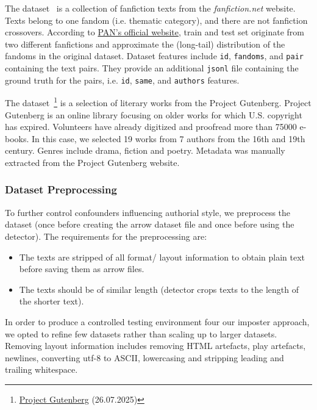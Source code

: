 The \dataPan{} dataset~\citep{bischoff_importance_2020} is a collection of fanfiction texts from the \textit{fanfiction.net} website.
Texts belong to one fandom (i.e. thematic category), and there are not fanfiction crossovers.
According to \href{https://pan.webis.de/clef20/pan20-web/author-identification.html}{PAN's official website}, 
train and test set originate from two different fanfictions and approximate the (long-tail) distribution of the fandoms in the original dataset.
Dataset features include \texttt{id}, \texttt{fandoms}, and \texttt{pair} containing the text pairs.
They provide an additional \texttt{jsonl} file containing the ground truth for the pairs, 
i.e. \texttt{id}, \texttt{same}, and \texttt{authors} features.

The \dataGutenberg{} dataset~\footnote{\href{https://www.gutenberg.org/}{Project Gutenberg} (26.07.2025)} 
is a selection of literary works from the Project Gutenberg.
Project Gutenberg is an online library focusing on older works for which U.S. copyright has expired.
Volunteers have already digitized and proofread more than \num{75000} e-books.
In this case, we selected 19 works from 7 authors from the 16th and 19th century.
Genres include drama, fiction and poetry.
Metadata was manually extracted from the Project Gutenberg website.


\subsubsection{Dataset Preprocessing}
\label{subsubsec:dataset_preprocessing}

To further control confounders influencing authorial style, we preprocess the dataset 
(once before creating the arrow dataset file and once before using the detector).
The requirements for the preprocessing are:
\begin{itemize}
    \item The texts are stripped of all format/ layout information to obtain plain text before saving them as arrow files.
    \item The texts should be of similar length (detector crops texts to the length of the shorter text).
\end{itemize}
In order to produce a controlled testing environment four our imposter approach, 
we opted to refine few datasets rather than scaling up to larger datasets.
Removing layout information includes removing HTML artefacts, play artefacts, newlines, 
converting utf-8 to ASCII, lowercasing and stripping leading and trailing whitespace.

